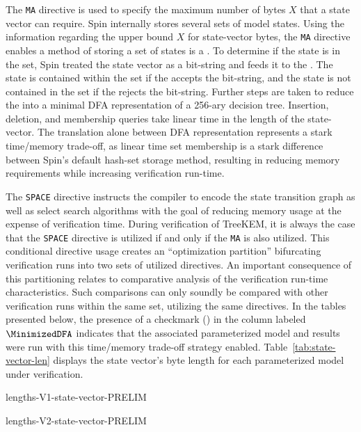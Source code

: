 The \texttt{MA} directive is used to specify the maximum number of bytes \(X\) that a state vector can require.
Spin internally stores several sets of model states.
Using the information regarding the upper bound \(X\) for state-vector bytes, the \texttt{MA} directive enables a method of storing a set of states is a  \autocite{holzmann1999minimized}.
To determine if the state is in the set, Spin treated the state vector as a bit-string and feeds it to the .
The state is contained within the set if the  accepts the bit-string, and the state is not contained in the set if the  rejects the bit-string.
Further steps are taken to reduce the  into a minimal DFA representation of a 256-ary decision tree.
Insertion, deletion, and membership queries take linear time in the length of the state-vector.
The translation alone between DFA representation represents a stark time/memory trade-off, as linear time set membership is a stark difference between Spin's default hash-set storage method, resulting in reducing memory requirements while increasing verification run-time.

The \texttt{SPACE} directive instructs the compiler to encode the state transition graph as well as select search algorithms with the goal of reducing memory usage at the expense of verification time.
During verification of TreeKEM, it is always the case that the \texttt{SPACE} directive is utilized if and only if the \texttt{MA} is also utilized.
This conditional directive usage creates an ``optimization partition'' bifurcating verification runs into two sets of utilized directives.
An important consequence of this partitioning relates to comparative analysis of the verification run-time characteristics.
Such comparisons can only soundly be compared with other verification runs within the same set, utilizing the same directives.
In the tables presented below, the presence of a checkmark (\cmark) in the column labeled $\MinimizedDFA$ indicates that the associated parameterized model and results were run with this time/memory trade-off strategy enabled.
Table\ \ref{tab:state-vector-len} displays the state vector's byte length for each \CGKAmod{\VersionOne}{}{} parameterized model under verification.

\begin{table}[ht!]
\caption[State vector byte length for each model]{%
\label{tab:state-vector-len}%
State vector byte length for each model parameterization of \CGKAmod{\VersionOne}{}{} and \CGKAmod{\VersionTwo}{}{}.
}%
\hfill
\begin{minipage}{0.45\textwidth}
  \centering
  {lengths-V1-state-vector-PRELIM}
\end{minipage}
\begin{minipage}{0.45\textwidth}
  \centering
  {lengths-V2-state-vector-PRELIM}
\end{minipage}
\hfill
\end{table}

